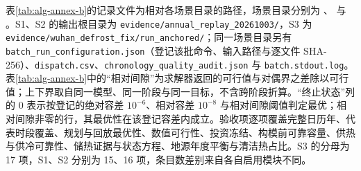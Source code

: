 \documentclass[12pt,a4paper]{article}
\begin{document}
表\ref{tab:alg-annex-b}的记录文件为相对各场景目录的路径，场景目录分别为 、 与 。S1、S2 的输出根目录为 \texttt{evidence/annual\_replay\_20261003/}，S3 为 \texttt{evidence/wuhan\_defrost\_fix/run\_anchored/}；同一场景目录另有 \texttt{batch\_run\_configuration.json}（登记该批命令、输入路径与逐文件 SHA-256）、\texttt{dispatch.csv}、\texttt{chronology\_quality\_audit.json} 与 \texttt{batch.stdout.log}。表\ref{tab:alg-annex-b}中的“相对间隙”为求解器返回的可行值与对偶界之差除以可行值；上下界取自同一模型、同一阶段与同一目标，不含跨阶段折算。“终止状态”列的 0 表示按登记的绝对容差 $10^{-6}$、相对容差 $10^{-8}$ 与相对间隙阈值判定最优；相对间隙非零的行，其最优性在该登记容差内成立。验收项逐项覆盖完整日历年、代表时段覆盖、规划与回放最优性、数值可行性、投资冻结、构模前可靠容量、供热与供冷可靠性、储热证据与状态方程、地源年度平衡与清洁热占比。S3 的分母为 17 项，S1、S2 分别为 15、16 项，条目数差别来自各自启用模块不同。
\end{document}

